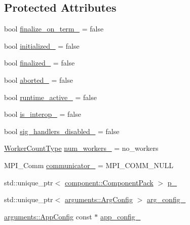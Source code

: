 \subsection*{Protected Attributes}
\begin{DoxyCompactItemize}
\item 
bool \hyperlink{structvt_1_1runtime_1_1_runtime_a1a7a0e6783b3326a4ded84f829a1d0b3}{finalize\+\_\+on\+\_\+term\+\_\+} = false
\item 
bool \hyperlink{structvt_1_1runtime_1_1_runtime_aaaad29e0591814b8f0632f2f85bd5e16}{initialized\+\_\+} = false
\item 
bool \hyperlink{structvt_1_1runtime_1_1_runtime_a2a798a2bf9b8c0a70785cde3cc8119c4}{finalized\+\_\+} = false
\item 
bool \hyperlink{structvt_1_1runtime_1_1_runtime_a19b9ad0859c6fb417b734ac1cc8be1a7}{aborted\+\_\+} = false
\item 
bool \hyperlink{structvt_1_1runtime_1_1_runtime_a0ab12b00f03032638dbc467d165bed30}{runtime\+\_\+active\+\_\+} = false
\item 
bool \hyperlink{structvt_1_1runtime_1_1_runtime_a1169e49a960d59b2e1c7d9f5f9ef838d}{is\+\_\+interop\+\_\+} = false
\item 
bool \hyperlink{structvt_1_1runtime_1_1_runtime_a09b053def0beaff3de9995e83b66170b}{sig\+\_\+handlers\+\_\+disabled\+\_\+} = false
\item 
\hyperlink{namespacevt_aa93398ea48f2cb6c188512250f7cc248}{Worker\+Count\+Type} \hyperlink{structvt_1_1runtime_1_1_runtime_ae0fc29c09650df6280cabeea1cb9e222}{num\+\_\+workers\+\_\+} = no\+\_\+workers
\item 
M\+P\+I\+\_\+\+Comm \hyperlink{structvt_1_1runtime_1_1_runtime_a91471f214fb5ce904fb2e0bf95b445e2}{communicator\+\_\+} = M\+P\+I\+\_\+\+C\+O\+M\+M\+\_\+\+N\+U\+LL
\item 
std\+::unique\+\_\+ptr$<$ \hyperlink{structvt_1_1runtime_1_1component_1_1_component_pack}{component\+::\+Component\+Pack} $>$ \hyperlink{structvt_1_1runtime_1_1_runtime_a9f7ea8f6852d934e9c0122e074df0886}{p\+\_\+}
\item 
std\+::unique\+\_\+ptr$<$ \hyperlink{structvt_1_1arguments_1_1_arg_config}{arguments\+::\+Arg\+Config} $>$ \hyperlink{structvt_1_1runtime_1_1_runtime_a585321b816d6984bf7a9489d00bd3670}{arg\+\_\+config\+\_\+}
\item 
\hyperlink{structvt_1_1arguments_1_1_app_config}{arguments\+::\+App\+Config} const  $\ast$ \hyperlink{structvt_1_1runtime_1_1_runtime_a5fa2ceccc0e96fe0a97e0454e3a0a1ee}{app\+\_\+config\+\_\+}
\end{DoxyCompactItemize}
